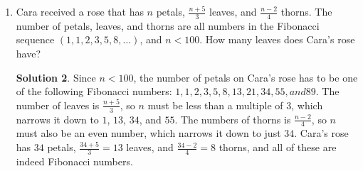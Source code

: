 \documentclass{article}
\theoremstyle{definition}
\newtheorem*{solution}{Solution}
\begin{document}
\begin{enumerate}
        \begin{solution}
            The lawn is mowed on days $1, 6, 11, 16, \dot, 191, 196, 201$. This
            is an arithmetic sequence and the common difference is $5$, since
            the lawn is mowed every $5$ days. To get from $1$ to $201$, the common
            difference will have been added $\frac{201 - 1}{5} = \frac{200}{5} =
            40$ times. This means day $201$ will be the $41$st mowing. For the
            first $40$ mowing days, the lawn will have been mowed $\frac{40}{4} =
            10$ times in each of the directions E-W, NE-SW, N-S, and NW-SE.
            Therefore, for the $41$st mowing, on Day $201$, the sequence of
            directions will begin again with a mowing in the direction on E-W or
            East-West.
        \end{solution}
        \item Cara received a rose that has $n$ petals, $\frac{n + 5}{3}$ leaves, and $\frac{n-2}{4}$ thorns. The number of petals, leaves, and thorns are all numbers in the Fibonacci sequence $(1, 1, 2, 3, 5, 8, \dots)$, and $n < 100$. How many leaves does Cara's rose have?
        \begin{solution}
            Since $n < 100$, the number of petals on Cara's rose has to be one of the following Fibonacci numbers: $1, 1, 2, 3, 5, 8, 13, 21, 34, 55, and 89$. The number of leaves is $\frac{n + 5}{3}$, so $n$ must be less than a multiple of $3$, which narrows it down to $1$, $13$, $34$, and $55$. The numbers of thorns is $\frac{n - 2}{4}$, so $n$ must also be an even number, which narrows it down to just $34$. Cara's rose has $34$ petals, $\frac{34 + 5}{3} = 13$ leaves, and $\frac{34 - 2}{4} = 8$ thorns, and all of these are indeed Fibonacci numbers.
        \end{solution}
    \end{enumerate}
\end{document}
